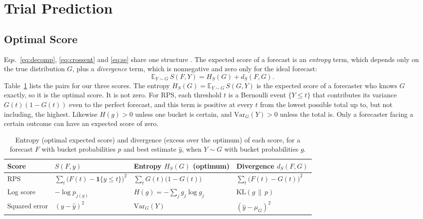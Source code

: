 \documentclass{article}
\newcommand{\1}{\mathbf{1}}
\newcommand{\E}{\mathbb{E}}
\begin{document}
\section{Trial Prediction}\label{sec:trial}
\subsection{Optimal Score}\label{sec:optimal}
Eqs.~\eqref{eq:decomp}, \eqref{eq:crossent} and \eqref{eq:se} share one structure \citep{gneiting2007}. The expected score of a forecast is an \emph{entropy} term, which depends only on the true distribution $G$, plus a \emph{divergence} term, which is nonnegative and zero only for the ideal forecast:
\begin{equation}\label{eq:entdiv}
\E_{Y \sim G}\, S(F, Y) = H_S(G) + d_S(F, G).
\end{equation}
Table~\ref{tab:entropy} lists the pairs for our three scores. The entropy $H_S(G) = \E_{Y \sim G}\, S(G, Y)$ is the expected score of a forecaster who knows $G$ exactly, so it is the optimal score. It is not zero. For RPS, each threshold $t$ is a Bernoulli event $\{Y \le t\}$ that contributes its variance $G(t)(1 - G(t))$ even to the perfect forecast, and this term is positive at every $t$ from the lowest possible total up to, but not including, the highest. Likewise $H(g) > 0$ unless one bucket is certain, and $\mathrm{Var}_G(Y) > 0$ unless the total is. Only a forecaster facing a certain outcome can have an expected score of zero.

\begin{table}[h]
\centering
\caption{Entropy (optimal expected score) and divergence (excess over the optimum) of each score, for a forecast $F$ with bucket probabilities $p$ and best estimate $\hat y$, when $Y \sim G$ with bucket probabilities $g$.}
\label{tab:entropy}
\begin{tabular}{llll}
\toprule
Score & $S(F, y)$ & Entropy $H_S(G)$ (optimum) & Divergence $d_S(F, G)$ \\
\midrule
RPS & $\sum_t \big(F(t) - \1\{y \le t\}\big)^2$ & $\sum_t G(t)\big(1 - G(t)\big)$ & $\sum_t \big(F(t) - G(t)\big)^2$ \\
Log score & $-\log p_{j(y)}$ & $H(g) = -\sum_j g_j \log g_j$ & $\mathrm{KL}(g \,\|\, p)$ \\
Squared error & $(y - \hat y)^2$ & $\mathrm{Var}_G(Y)$ & $(\hat y - \mu_G)^2$ \\
\bottomrule
\end{tabular}
\end{table}
\end{document}
